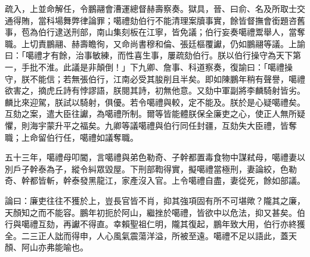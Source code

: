 \begin{pinyinscope}
疏入，上並命解任，令鵬翮會漕運總督赫壽察奏。獄具，晉、曰俞、名及所取士交通得賄，當科場舞弊律論罪；噶禮劾伯行不能清理案牘事實，餘皆督撫會銜題咨舊事，苞為伯行逮送刑部，南山集刻板在江寧，皆免議；伯行妄奏噶禮鬻舉人，當奪職。上切責鵬翮、赫壽瞻徇，又命尚書穆和倫、張廷樞覆讞，仍如鵬翮等議。上諭曰：「噶禮才有餘，治事敏練，而性喜生事，屢疏劾伯行。朕以伯行操守為天下第一，手批不淮。此議是非顛倒！」下九卿、詹事、科道察奏，復諭曰：「噶禮操守，朕不能信；若無張伯行，江南必受其朘削且半矣。即如陳鵬年稍有聲譽，噶禮欲害之，摘虎丘詩有悖謬語，朕閱其詩，初無他意。又劾中軍副將李麟騎射皆劣。麟比來迎駕，朕試以騎射，俱優。若令噶禮與較，定不能及。朕於是心疑噶禮矣。互劾之案，遣大臣往讞，為噶禮所制。爾等皆能體朕保全廉吏之心，使正人無所疑懼，則海宇蒙升平之福矣。九卿等議噶禮與伯行同任封疆，互劾失大臣禮，皆奪職；上命留伯行任，噶禮如議奪職。

五十三年，噶禮母叩閽，言噶禮與弟色勒奇、子幹都置毒食物中謀弒母，噶禮妻以別戶子幹泰為子，縱令糾眾毀屋。下刑部鞫得實，擬噶禮當極刑，妻論絞，色勒奇、幹都皆斬，幹泰發黑龍江，家產沒入官。上令噶禮自盡，妻從死，餘如部議。

論曰：廉吏往往不獲於上，豈長官皆不肖，抑其強項固有所不可堪歟？隴其之廉，天顏知之而不能容。鵬年初扼於阿山，繼挫於噶禮，皆欲中以危法，抑又甚矣。伯行與噶禮互劾，再讞不得直。幸賴聖祖仁明，隴其復起，鵬年致大用，伯行亦終獲全。二三正人詘而得申，人心風氣震蕩洋溢，所被至遠。噶禮不足以語此，蓋天顏、阿山亦弗能喻也。


\end{pinyinscope}